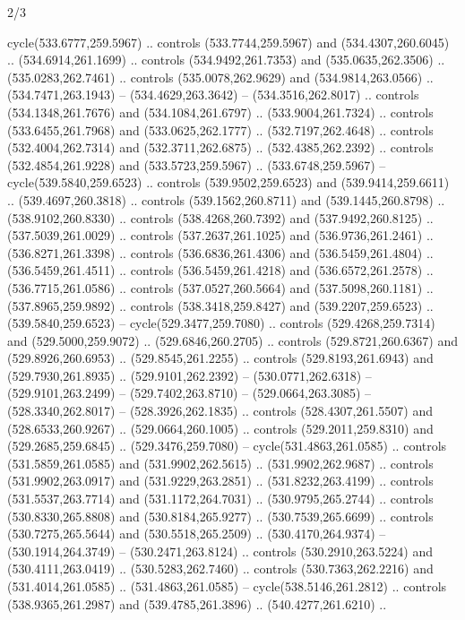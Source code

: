 \begin{flagdescription}{2/3}
\begin{scope}[xshift=0.5\flaglength,yshift=0.5\flagwidth,scale=\flagwidth/495.65]
\begin{scope}[y=0.8pt, x=0.8pt, yscale=-1,shift={(-463.76,-309.78)}]
  cycle(533.6777,259.5967) .. controls (533.7744,259.5967) and
  (534.4307,260.6045) .. (534.6914,261.1699) .. controls (534.9492,261.7353) and
  (535.0635,262.3506) .. (535.0283,262.7461) .. controls (535.0078,262.9629) and
  (534.9814,263.0566) .. (534.7471,263.1943) -- (534.4629,263.3642) --
  (534.3516,262.8017) .. controls (534.1348,261.7676) and (534.1084,261.6797) ..
  (533.9004,261.7324) .. controls (533.6455,261.7968) and (533.0625,262.1777) ..
  (532.7197,262.4648) .. controls (532.4004,262.7314) and (532.3711,262.6875) ..
  (532.4385,262.2392) .. controls (532.4854,261.9228) and (533.5723,259.5967) ..
  (533.6748,259.5967) -- cycle(539.5840,259.6523) .. controls
  (539.9502,259.6523) and (539.9414,259.6611) .. (539.4697,260.3818) .. controls
  (539.1562,260.8711) and (539.1445,260.8798) .. (538.9102,260.8330) .. controls
  (538.4268,260.7392) and (537.9492,260.8125) .. (537.5039,261.0029) .. controls
  (537.2637,261.1025) and (536.9736,261.2461) .. (536.8271,261.3398) .. controls
  (536.6836,261.4306) and (536.5459,261.4804) .. (536.5459,261.4511) .. controls
  (536.5459,261.4218) and (536.6572,261.2578) .. (536.7715,261.0586) .. controls
  (537.0527,260.5664) and (537.5098,260.1181) .. (537.8965,259.9892) .. controls
  (538.3418,259.8427) and (539.2207,259.6523) .. (539.5840,259.6523) --
  cycle(529.3477,259.7080) .. controls (529.4268,259.7314) and
  (529.5000,259.9072) .. (529.6846,260.2705) .. controls (529.8721,260.6367) and
  (529.8926,260.6953) .. (529.8545,261.2255) .. controls (529.8193,261.6943) and
  (529.7930,261.8935) .. (529.9101,262.2392) -- (530.0771,262.6318) --
  (529.9101,263.2499) -- (529.7402,263.8710) -- (529.0664,263.3085) --
  (528.3340,262.8017) -- (528.3926,262.1835) .. controls (528.4307,261.5507) and
  (528.6533,260.9267) .. (529.0664,260.1005) .. controls (529.2011,259.8310) and
  (529.2685,259.6845) .. (529.3476,259.7080) -- cycle(531.4863,261.0585) ..
  controls (531.5859,261.0585) and (531.9902,262.5615) .. (531.9902,262.9687) ..
  controls (531.9902,263.0917) and (531.9229,263.2851) .. (531.8232,263.4199) ..
  controls (531.5537,263.7714) and (531.1172,264.7031) .. (530.9795,265.2744) ..
  controls (530.8330,265.8808) and (530.8184,265.9277) .. (530.7539,265.6699) ..
  controls (530.7275,265.5644) and (530.5518,265.2509) .. (530.4170,264.9374) --
  (530.1914,264.3749) -- (530.2471,263.8124) .. controls (530.2910,263.5224) and
  (530.4111,263.0419) .. (530.5283,262.7460) .. controls (530.7363,262.2216) and
  (531.4014,261.0585) .. (531.4863,261.0585) -- cycle(538.5146,261.2812) ..
  controls (538.9365,261.2987) and (539.4785,261.3896) .. (540.4277,261.6210) ..

\end{scope}
\end{scope}
\end{flagdescription}
